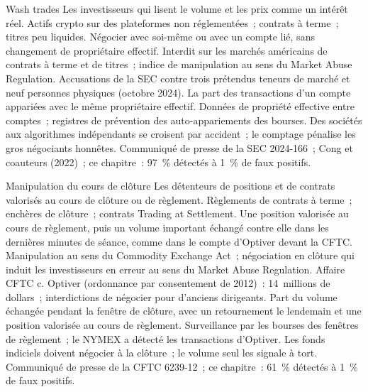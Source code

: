 \begin{strategyfile}{Wash trades}\label{strat:s2:manipulative-strategies-and-how-they-are-caught:wash}
 Les investisseurs qui lisent le volume et les prix comme un intérêt réel.
 Actifs crypto sur des plateformes non réglementées~; contrats à terme~; titres peu liquides.
 Négocier avec soi-même ou avec un compte lié, sans changement de propriétaire effectif.
 Interdit sur les marchés américains de contrats à terme et de titres~; indice de manipulation au sens du Market Abuse Regulation.
 Accusations de la SEC contre trois prétendus teneurs de marché et neuf personnes physiques (octobre 2024).
 La part des transactions d'un compte appariées avec le même propriétaire effectif.
 Données de propriété effective entre comptes~; registres de prévention des auto-appariements des bourses.
 Des sociétés aux algorithmes indépendants se croisent par accident~; le comptage pénalise les gros négociants honnêtes.
 Communiqué de presse de la SEC 2024-166~; Cong et coauteurs (2022)~; ce chapitre~: 97~\% détectés à 1~\% de faux positifs.
\end{strategyfile}

\begin{strategyfile}{Manipulation du cours de clôture}\label{strat:s2:manipulative-strategies-and-how-they-are-caught:close}
 Les détenteurs de positions et de contrats valorisés au cours de clôture ou de règlement.
 Règlements de contrats à terme~; enchères de clôture~; contrats Trading at Settlement.
 Une position valorisée au cours de règlement, puis un volume important échangé contre elle dans les dernières minutes de séance, comme dans le compte d'Optiver devant la CFTC.
 Manipulation au sens du Commodity Exchange Act~; négociation en clôture qui induit les investisseurs en erreur au sens du Market Abuse
Regulation.
 Affaire CFTC c. Optiver (ordonnance par consentement de 2012)~: 14~millions de dollars~; interdictions de négocier pour d'anciens dirigeants.
 Part du volume échangée pendant la fenêtre de clôture, avec un retournement le lendemain et une position valorisée au cours de règlement.
 Surveillance par les bourses des fenêtres de règlement~; le NYMEX a détecté les transactions d'Optiver.
 Les fonds indiciels doivent négocier à la clôture~; le volume seul les signale à tort.
 Communiqué de presse de la CFTC 6239-12~; ce chapitre~: 61~\% détectés à 1~\% de faux positifs.
\end{strategyfile}

